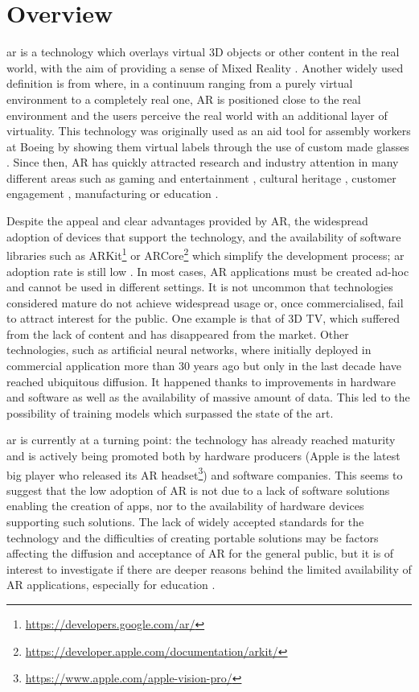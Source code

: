 \section{Overview}\label{sec:overview}

\gls{ar} is a technology which overlays virtual 3D objects or other content in the real world, with the aim of providing a sense of Mixed Reality \citep{azuma1997survey}. Another widely used definition is from \cite{milgram1994taxonomy} where, in a continuum ranging from a purely virtual environment to a completely real one, AR is positioned close to the real environment and the users perceive the real world with an additional layer of virtuality. This technology was originally used as an aid tool for assembly workers at Boeing by showing them virtual labels through the use of custom made glasses \citep{caudell1992augmented}. Since then, AR has quickly attracted research and industry attention in many different areas such as gaming and entertainment \citep{das2017augmented}, cultural heritage \citep{vlachos2022review}, customer engagement \citep{mclean2019shopping}, manufacturing \citep{ong2008augmented} or education \citep{garzon2019systematic}. 

Despite the appeal and clear advantages provided by AR, the widespread adoption of devices that support the technology, and the availability of software libraries such as ARKit\footnote{\url{https://developers.google.com/ar/}} or ARCore\footnote{\url{https://developer.apple.com/documentation/arkit/}} which simplify the development process; \gls{ar} adoption rate is still low \citep{jalo2022extended}. In most cases, AR applications must be created ad-hoc and cannot be used in different settings. It is not uncommon that technologies considered mature do not achieve widespread usage or, once commercialised, fail to attract interest for the public. One example is that of 3D TV, which suffered from the lack of content and has disappeared from the market. Other technologies, such as artificial neural networks, where initially deployed in commercial application more than 30 years ago \citep{lecun1989handwritten} but only in the last decade have reached ubiquitous diffusion. It happened thanks to improvements in hardware and software as well as the availability of massive amount of data. This led to the possibility of training models which surpassed the state of the art.

\gls{ar} is currently at a turning point: the technology has already reached maturity and is actively being promoted both by hardware producers (Apple is the latest big player who released its AR headset\footnote{\url{https://www.apple.com/apple-vision-pro/}}) and software companies. This seems to suggest that the low adoption of AR is not due to a lack of software solutions enabling the creation of apps, nor to the availability of hardware devices supporting such solutions. The lack of widely accepted standards for the technology and the difficulties of creating portable solutions may be factors affecting the diffusion and acceptance of AR for the general public, but it is of interest to investigate if there are deeper reasons behind the limited availability of AR applications, especially for education \citep{doi/10.2759/121671}.

